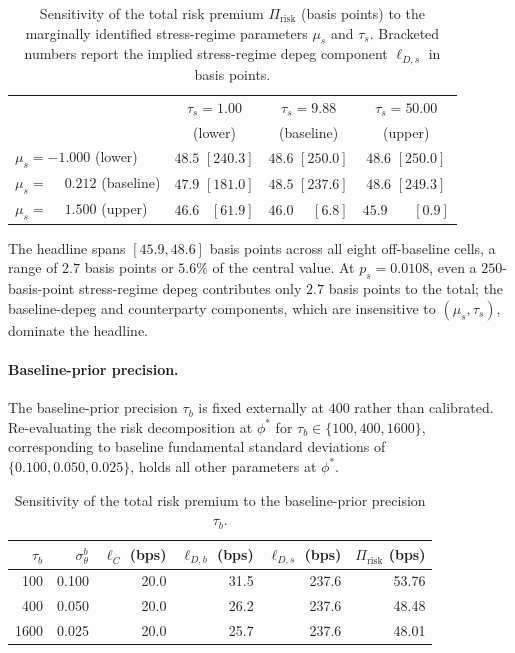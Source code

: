 \begin{table}[H]
\centering
\caption{Sensitivity of the total risk premium $\Pi_{\text{risk}}$ (basis points) to the marginally identified stress-regime parameters $\mu_s$ and $\tau_s$. Bracketed numbers report the implied stress-regime depeg component $\ell_{D,s}$ in basis points.}\label{tab:sensitivity}
\begin{tabular}{lccc}
\toprule
& $\tau_s = 1.00$ & $\tau_s = 9.88$ & $\tau_s = 50.00$ \\
& (lower)         & (baseline)      & (upper)           \\
\midrule
$\mu_s = -1.000$ (lower)    & $48.5$ $[240.3]$ & $48.6$ $[250.0]$ & $48.6$ $[250.0]$ \\
$\mu_s = \phantom{-}0.212$ (baseline) & $47.9$ $[181.0]$ & $\mathbf{48.5}$ $[\mathbf{237.6}]$ & $48.6$ $[249.3]$ \\
$\mu_s = \phantom{-}1.500$ (upper)    & $46.6$ $\phantom{0}[61.9]$  & $46.0$ $\phantom{00}[6.8]$  & $45.9$ $\phantom{000}[0.9]$ \\
\bottomrule
\end{tabular}
\end{table}

The headline spans $[45.9, 48.6]$ basis points across all eight off-baseline cells, a range of $2.7$ basis points or $5.6\%$ of the central value. At $p_s = 0.0108$, even a $250$-basis-point stress-regime depeg contributes only $2.7$ basis points to the total; the baseline-depeg and counterparty components, which are insensitive to $(\mu_s, \tau_s)$, dominate the headline.

\paragraph{Baseline-prior precision.} The baseline-prior precision $\tau_b$ is fixed externally at $400$ rather than calibrated. Re-evaluating the risk decomposition at $\phi^*$ for $\tau_b \in \{100, 400, 1600\}$, corresponding to baseline fundamental standard deviations of $\{0.100, 0.050, 0.025\}$, holds all other parameters at $\phi^*$.

\begin{table}[H]
\centering
\caption{Sensitivity of the total risk premium to the baseline-prior precision $\tau_b$.}\label{tab:sens_tau_b}
\begin{tabular}{rrrrrr}
\toprule
$\tau_b$ & $\sigma_\theta^b$ & $\ell_C$ (bps) & $\ell_{D,b}$ (bps) & $\ell_{D,s}$ (bps) & $\Pi_{\text{risk}}$ (bps) \\
\midrule
100  & 0.100 & 20.0 & 31.5 & 237.6 & 53.76 \\
400  & 0.050 & 20.0 & 26.2 & 237.6 & 48.48 \\
1600 & 0.025 & 20.0 & 25.7 & 237.6 & 48.01 \\
\bottomrule
\end{tabular}
\end{table}

